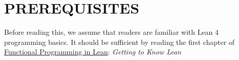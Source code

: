 \chapter{PREREQUISITES}

Before reading this, we assume that readers are familiar with Lean 4 programming basics. It should be sufficient by reading the first chapter of \href{https://lean-lang.org/functional_programming_in_lean/}{Functional Programming in Lean}: \textit{Getting to Know Lean}